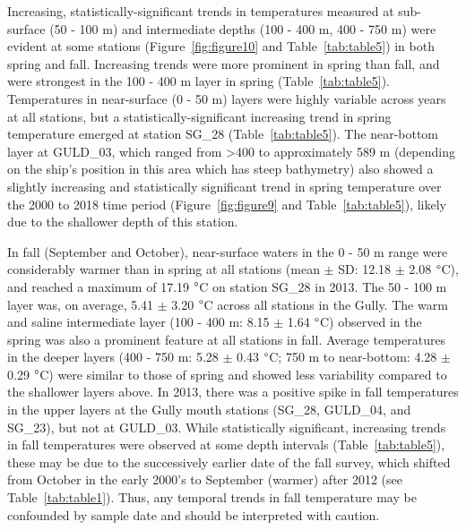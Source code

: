 \documentclass[12pt]{article}\usepackage[]{graphicx}\usepackage[]{color}
\begin{document}
Increasing, statistically-significant trends in temperatures measured at sub-surface (50 - 100 m) and intermediate depths (100 - 400 m, 400 - 750 m) were evident at some stations (Figure~\ref{fig:figure10} and Table~\ref{tab:table5}) in both spring and fall. Increasing trends were more prominent in spring than fall, and were strongest in the 100 - 400 m layer in spring (Table~\ref{tab:table5}). Temperatures in near-surface (0 - 50 m) layers were highly variable across years at all stations, but a statistically-significant increasing trend in spring temperature emerged at station SG\_28 (Table~\ref{tab:table5}). The near-bottom layer at GULD\_03, which ranged from \textgreater400 to approximately 589 m (depending on the ship's position in this area which has steep bathymetry) also showed a slightly increasing and statistically significant trend in spring temperature over the 2000 to 2018 time period (Figure~\ref{fig:figure9} and Table~\ref{tab:table5}), likely due to the shallower depth of this station.

In fall (September and October), near-surface waters in the 0 - 50 m range were considerably warmer than in spring at all stations (mean \(\pm\) SD: 12.18 \(\pm\) 2.08 \(\degree\)C), and reached a maximum of 17.19 \(\degree\)C on station SG\_28 in 2013. The 50 - 100 m layer was, on average, 5.41 \(\pm\) 3.20 \(\degree\)C across all stations in the Gully. The warm and saline intermediate layer (100 - 400 m: 8.15 \(\pm\) 1.64 \(\degree\)C) observed in the spring was also a prominent feature at all stations in fall. Average temperatures in the deeper layers (400 - 750 m: 5.28 \(\pm\) 0.43 \(\degree\)C; 750 m to near-bottom: 4.28 \(\pm\) 0.29 \(\degree\)C) were similar to those of spring and showed less variability compared to the shallower layers above. In 2013, there was a positive spike in fall temperatures in the upper layers at the Gully mouth stations (SG\_28, GULD\_04, and SG\_23), but not at GULD\_03. While statistically significant, increasing trends in fall temperatures were observed at some depth intervals (Table~\ref{tab:table5}), these may be due to the successively earlier date of the fall survey, which shifted from October in the early 2000's to September (warmer) after 2012 (see Table~\ref{tab:table1}). Thus, any temporal trends in fall temperature may be confounded by sample date and should be interpreted with caution.
\end{document}
